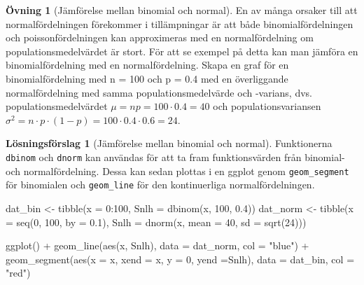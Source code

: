 \documentclass[
]{book}
\newenvironment{Shaded}{\begin{snugshade}}{\end{snugshade}}
\newcommand{\AttributeTok}[1]{\textcolor[rgb]{0.77,0.63,0.00}{#1}}
\newcommand{\DecValTok}[1]{\textcolor[rgb]{0.00,0.00,0.81}{#1}}
\newcommand{\FloatTok}[1]{\textcolor[rgb]{0.00,0.00,0.81}{#1}}
\newcommand{\FunctionTok}[1]{\textcolor[rgb]{0.00,0.00,0.00}{#1}}
\newcommand{\NormalTok}[1]{#1}
\newcommand{\OtherTok}[1]{\textcolor[rgb]{0.56,0.35,0.01}{#1}}
\newcommand{\SpecialCharTok}[1]{\textcolor[rgb]{0.00,0.00,0.00}{#1}}
\newcommand{\StringTok}[1]{\textcolor[rgb]{0.31,0.60,0.02}{#1}}
\theoremstyle{definition}
\theoremstyle{definition}
\theoremstyle{definition}
\newtheorem{exercise}{Övning}[chapter]
\theoremstyle{definition}
\newtheorem{hypothesis}{Lösningsförslag}[chapter]
\theoremstyle{remark}
\begin{document}
\begin{exercise}[Jämförelse mellan binomial och normal]
En av många orsaker till att normalfördelningen förekommer i tillämpningar är att både binomialfördelningen och poissonfördelningen kan approximeras med en normalfördelning om populationsmedelvärdet är stort. För att se exempel på detta kan man jämföra en binomialfördelning med en normalfördelning. Skapa en graf för en binomialfördelning med n = 100 och p = 0.4 med en överliggande normalfördelning med samma populationsmedelvärde och -varians, dvs. populationsmedelvärdet \(\mu = np = 100 \cdot 0.4 = 40\) och populationsvariansen \(\sigma^2 = n\cdot p \cdot (1-p) = 100 \cdot 0.4 \cdot 0.6 = 24\).
\end{exercise}

\begin{hypothesis}[Jämförelse mellan binomial och normal]
Funktionerna \texttt{dbinom} och \texttt{dnorm} kan användas för att ta fram funktionsvärden från binomial- och normalfördelning. Dessa kan sedan plottas i en ggplot genom \texttt{geom\_segment} för binomialen och \texttt{geom\_line} för den kontinuerliga normalfördelningen.

\begin{Shaded}
\begin{Highlighting}[]
\NormalTok{dat\_bin }\OtherTok{\textless{}{-}} \FunctionTok{tibble}\NormalTok{(}\AttributeTok{x =} \DecValTok{0}\SpecialCharTok{:}\DecValTok{100}\NormalTok{,}
                  \AttributeTok{Snlh =} \FunctionTok{dbinom}\NormalTok{(x, }\DecValTok{100}\NormalTok{, }\FloatTok{0.4}\NormalTok{))}
\NormalTok{dat\_norm }\OtherTok{\textless{}{-}} \FunctionTok{tibble}\NormalTok{(}\AttributeTok{x =} \FunctionTok{seq}\NormalTok{(}\DecValTok{0}\NormalTok{, }\DecValTok{100}\NormalTok{, }\AttributeTok{by =} \FloatTok{0.1}\NormalTok{),}
                   \AttributeTok{Snlh =} \FunctionTok{dnorm}\NormalTok{(x, }\AttributeTok{mean =} \DecValTok{40}\NormalTok{, }\AttributeTok{sd =} \FunctionTok{sqrt}\NormalTok{(}\DecValTok{24}\NormalTok{)))}

\FunctionTok{ggplot}\NormalTok{() }\SpecialCharTok{+}
  \FunctionTok{geom\_line}\NormalTok{(}\FunctionTok{aes}\NormalTok{(x, Snlh), }\AttributeTok{data =}\NormalTok{ dat\_norm, }\AttributeTok{col =} \StringTok{"blue"}\NormalTok{) }\SpecialCharTok{+}
  \FunctionTok{geom\_segment}\NormalTok{(}\FunctionTok{aes}\NormalTok{(}\AttributeTok{x =}\NormalTok{ x, }\AttributeTok{xend =}\NormalTok{ x, }\AttributeTok{y =} \DecValTok{0}\NormalTok{, }\AttributeTok{yend =}\NormalTok{Snlh), }
               \AttributeTok{data =}\NormalTok{ dat\_bin, }\AttributeTok{col =} \StringTok{"red"}\NormalTok{) }
\end{Highlighting}
\end{Shaded}


\end{hypothesis}
\end{document}
